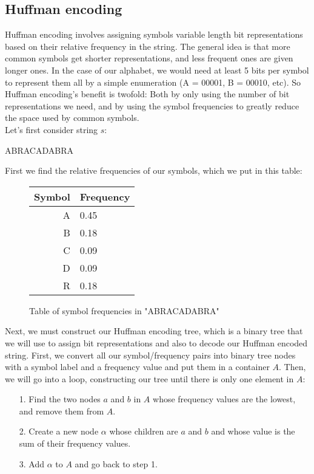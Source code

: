 \documentclass[11pt]{article}
\begin{document}
\subsection{Huffman encoding}\label{huffman-subsect}
Huffman encoding involves assigning symbols variable length bit representations based on their relative 
frequency in the string. The general idea is that more common symbols get shorter representations, 
and less frequent ones are given longer ones. In the case of our alphabet, we would need at least 5 
bits per symbol to represent them all by a simple enumeration (A = 00001, B = 00010, etc). So Huffman encoding's 
benefit is twofold: Both by only using the number of bit representations we need, 
and by using the symbol frequencies to greatly reduce the space used by common symbols.\\
Let's first consider string $s$:
\begin{center}ABRACADABRA\end{center}
First we find the relative frequencies of our symbols, which we put in this table:
\begin{figure}[H]\begin{center}\begin{tabular}{ r | l }
	Symbol & Frequency \\
	\hline
	A & 0.45 \\
	B & 0.18 \\
	C & 0.09 \\
	D & 0.09 \\
	R & 0.18 \\
\end{tabular}\caption{Table of symbol frequencies in "ABRACADABRA"}\end{center}\end{figure}
Next, we must construct our Huffman encoding tree, which is a binary tree that we will use to assign bit representations 
and also to decode our Huffman encoded string. First, we convert all our symbol/frequency pairs into binary tree nodes 
with a symbol label and a frequency value and put them in a container $A$. Then, we will go into a loop, constructing 
our tree until there is only one element in $A$:
\begin{itemize}
	\item[1.] Find the two nodes $a$ and $b$ in $A$ whose frequency values are the lowest, and remove them from $A$.
	\item[2.] Create a new node $\alpha$ whose children are $a$ and $b$ and whose value is the sum of their frequency values. 
	\item[3.] Add $\alpha$ to $A$ and go back to step 1. 
\end{itemize}
\end{document}

